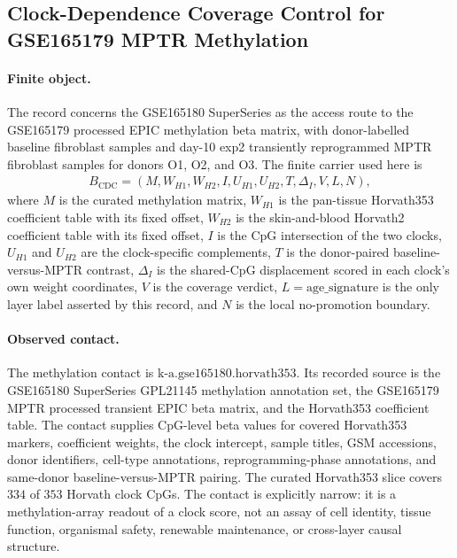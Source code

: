\subsection{Clock-Dependence Coverage Control for GSE165179 MPTR Methylation}
\label{sec:age-clock-shift-clock-dependence-coverage-control-gse165180}

\paragraph{Finite object.}
The record concerns the GSE165180 SuperSeries as the access route to the GSE165179 processed EPIC methylation beta matrix, with donor-labelled baseline fibroblast samples and day-10 exp2 transiently reprogrammed MPTR fibroblast samples for donors O1, O2, and O3. The finite carrier used here is
$$
\begin{aligned}
B_{\mathrm{CDC}}=(M,W_{H1},W_{H2},I,U_{H1},U_{H2},T,\Delta_I,V,L,N),
\end{aligned}
$$
where $M$ is the curated methylation matrix, $W_{H1}$ is the pan-tissue Horvath353 coefficient table with its fixed offset, $W_{H2}$ is the skin-and-blood Horvath2 coefficient table with its fixed offset, $I$ is the CpG intersection of the two clocks, $U_{H1}$ and $U_{H2}$ are the clock-specific complements, $T$ is the donor-paired baseline-versus-MPTR contrast, $\Delta_I$ is the shared-CpG displacement scored in each clock's own weight coordinates, $V$ is the coverage verdict, $L=\mathrm{age\_signature}$ is the only layer label asserted by this record, and $N$ is the local no-promotion boundary.

\paragraph{Observed contact.}
The methylation contact is $\mathrm{k\text{-}a.gse165180.horvath353}$. Its recorded source is the GSE165180 SuperSeries GPL21145 methylation annotation set, the GSE165179 MPTR processed transient EPIC beta matrix, and the Horvath353 coefficient table. The contact supplies CpG-level beta values for covered Horvath353 markers, coefficient weights, the clock intercept, sample titles, GSM accessions, donor identifiers, cell-type annotations, reprogramming-phase annotations, and same-donor baseline-versus-MPTR pairing. The curated Horvath353 slice covers $334$ of $353$ Horvath clock CpGs. The contact is explicitly narrow: it is a methylation-array readout of a clock score, not an assay of cell identity, tissue function, organismal safety, renewable maintenance, or cross-layer causal structure.

